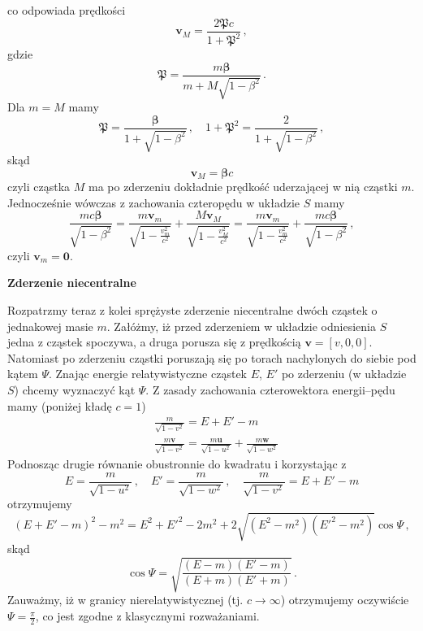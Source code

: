 \documentclass[../main.tex]{subfiles}
\begin{document}
co odpowiada prędkości
\begin{equation*}
    \mathbf{v}_M=\frac{2\boldsymbol{\mathfrak{P}}c}{1+\mathfrak{P}^2}\,,
\end{equation*}
gdzie
\begin{equation*}
    \boldsymbol{\mathfrak{P}}=\frac{m\boldsymbol{\beta}}{m+M\sqrt{1-\beta^2}}\,.
\end{equation*}
Dla \(m=M\) mamy
\begin{equation*}
    \boldsymbol{\mathfrak{P}}=\frac{\boldsymbol{\beta}}{1+\sqrt{1-\beta^2}}\,,\quad 1+\mathfrak{P}^2=\frac{2}{1+\sqrt{1-\beta^2}}\,,
\end{equation*}
skąd
\begin{equation*}
    \mathbf{v}_M=\boldsymbol{\beta}c
\end{equation*}
czyli cząstka \(M\) ma po zderzeniu dokładnie prędkość uderzającej w nią cząstki \(m\). Jednocześnie wówczas z zachowania czteropędu w układzie \(S\) mamy
\begin{equation*}
    \frac{mc\boldsymbol{\beta}}{\sqrt{1-\beta^2}}=\frac{m\mathbf{v}_m}{\sqrt{1-\frac{v_m^2}{c^2}}}+\frac{M\mathbf{v}_M}{\sqrt{1-\frac{v_M^2}{c^2}}}=\frac{m\mathbf{v}_m}{\sqrt{1-\frac{v_m^2}{c^2}}}+\frac{mc\boldsymbol{\beta}}{\sqrt{1-\beta^2}}\,,
\end{equation*}
czyli \(\mathbf{v}_m=\mathbf{0}\).
\medskip

\noindent\textbf{Zderzenie niecentralne}
\medskip

Rozpatrzmy teraz z kolei sprężyste zderzenie niecentralne dwóch cząstek o jednakowej masie \(m\). Załóżmy, iż przed zderzeniem w układzie odniesienia \(S\) jedna z cząstek spoczywa, a druga porusza się z prędkością \(\mathbf{v}=[v,0,0]\). Natomiast po zderzeniu cząstki poruszają się po torach nachylonych do siebie pod kątem \(\Psi\). Znając energie relatywistyczne cząstek \(E\), \(E'\) po zderzeniu (w układzie \(S\)) chcemy wyznaczyć kąt \(\Psi\). Z zasady zachowania czterowektora energii--pędu mamy (poniżej kładę \(c=1\))
\begin{equation*}
\begin{split}
    &\frac{m}{\sqrt{1-v^2}}=E+E'-m\\
    &\frac{m\mathbf{v}}{\sqrt{1-v^2}}=\frac{m\mathbf{u}}{\sqrt{1-u^2}}+\frac{m\mathbf{w}}{\sqrt{1-w^2}}
\end{split}
\end{equation*}
Podnosząc drugie równanie obustronnie do kwadratu i korzystając z 
\begin{equation*}
    E=\frac{m}{\sqrt{1-u^2}}\,,\quad E'=\frac{m}{\sqrt{1-w^2}}\,,\quad \frac{m}{\sqrt{1-v^2}}=E+E'-m
\end{equation*}
otrzymujemy
\begin{equation*}
    (E+E'-m)^2-m^2=E^2+E'^2-2m^2+2\sqrt{(E^2-m^2)(E'^2-m^2)}\cos\Psi\,,
\end{equation*}
skąd
\begin{equation*}
    \cos\Psi=\sqrt{\frac{(E-m)(E'-m)}{(E+m)(E'+m)}}\,.
\end{equation*}
Zauważmy, iż w granicy nierelatywistycznej (tj. \(c\to\infty\)) otrzymujemy oczywiście \(\Psi=\frac{\pi}{2}\), co jest zgodne z klasycznymi rozważaniami.
\end{document}
